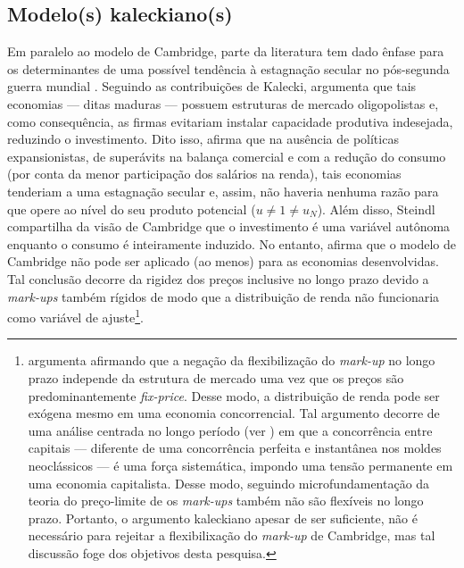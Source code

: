 \subsection{Modelo(s) kaleckiano(s)}

Em paralelo ao modelo de Cambridge, parte da literatura tem dado ênfase para os determinantes de uma possível tendência à estagnação secular no pós-segunda guerra mundial \cite{setterfield_distribution_2002}.
Seguindo as contribuições de Kalecki, \textcite{steindl_maturity_1952} argumenta que tais economias --- ditas maduras --- possuem estruturas de mercado oligopolistas e, como consequência, as firmas evitariam instalar capacidade produtiva indesejada, reduzindo o investimento. 
Dito isso, \textcite{steindl_stagnation_1979} afirma que na ausência de políticas expansionistas, de superávits na balança comercial e com a redução do consumo (por conta da menor participação dos salários na renda),  tais economias tenderiam a uma estagnação secular e, assim,  não haveria nenhuma razão para que opere ao nível do seu produto potencial ($u\neq 1 \neq u_N$). 
Além disso, Steindl compartilha da visão de Cambridge que o investimento é uma variável autônoma enquanto o consumo é inteiramente induzido. 
No entanto, afirma que o modelo de Cambridge não pode ser aplicado (ao menos) para as economias desenvolvidas.  
Tal conclusão decorre da rigidez dos preços inclusive no longo prazo devido a \textit{mark-ups} também rígidos de modo que a distribuição de renda não funcionaria como variável de ajuste\footnote{
	\textcite{serrano_sraffian_1995} argumenta afirmando que a negação da flexibilização do \textit{mark-up} no longo prazo independe da estrutura de mercado uma vez que os preços são predominantemente \textit{fix-price}. Desse modo, a distribuição de renda pode ser exógena mesmo em uma economia concorrencial. Tal argumento decorre de uma análise centrada no longo período (ver \textcite{milgate_capital_1982}) em que a concorrência entre capitais --- diferente de uma concorrência perfeita e instantânea nos moldes neoclássicos ---  é uma força sistemática, impondo uma tensão permanente em uma economia capitalista. 
	Desse modo, seguindo microfundamentação da teoria do preço-limite de \textcite{labini} os \textit{mark-ups} também não são flexíveis no longo prazo.
	Portanto, o argumento kaleckiano apesar de ser suficiente,  não é necessário para  rejeitar a flexibilixação do \textit{mark-up} de Cambridge, mas tal discussão foge dos objetivos desta pesquisa.
}.

